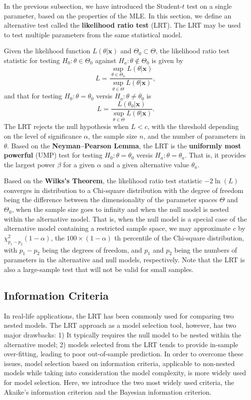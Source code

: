 \documentclass[]{book}
\theoremstyle{definition}
\theoremstyle{definition}
\theoremstyle{definition}
\theoremstyle{remark}
\begin{document}
In the previous subsection, we have introduced the Student-\(t\) test on
a single parameter, based on the properties of the MLE. In this section,
we define an alternative test called the \textbf{likelihood ratio test}
(LRT). The LRT may be used to test multiple parameters from the same
statistical model.

Given the likelihood function \(L(\theta|\mathbf{x})\) and
\(\Theta_0 \subset \Theta\), the likelihood ratio test statistic for
testing \(H_0:\theta\in\Theta_0\) against \(H_a:\theta\notin\Theta_0\)
is given by
\[L=\frac{\sup_{\theta\in\Theta_0}L(\theta|\mathbf{x})}{\sup_{\theta\in\Theta}L(\theta|\mathbf{x})},\]
and that for testing \(H_0:\theta=\theta_0\) versis
\(H_a:\theta\neq\theta_0\) is
\[L=\frac{L(\theta_0|\mathbf{x})}{\sup_{\theta\in\Theta}L(\theta|\mathbf{x})}.\]
The LRT rejects the null hypothesis when \(L < c\), with the threshold
depending on the level of significance \(\alpha\), the sample size
\(n\), and the number of parameters in \(\theta\). Based on the
\textbf{Neyman--Pearson Lemma}, the LRT is the \textbf{uniformly most
powerful} (UMP) test for testing \(H_0:\theta=\theta_0\) versis
\(H_a:\theta=\theta_a\). That is, it provides the largest power
\(\beta\) for a given \(\alpha\) and a given alternative value
\(\theta_a\).

Based on the \textbf{Wilks's Theorem}, the likelihood ratio test
statistic \(-2\ln(L)\) converges in distribution to a Chi-square
distribution with the degree of freedom being the difference between the
dimensionality of the parameter spaces \(\Theta\) and \(\Theta_0\), when
the sample size goes to infinity and when the null model is nested
within the alternative model. That is, when the null model is a special
case of the alternative model containing a restricted sample space, we
may approximate \(c\) by \(\chi^2_{p_1 - p_2}(1-\alpha)\), the
\(100\times(1-\alpha)\) th percentile of the Chi-square distribution,
with \(p_1-p_2\) being the degrees of freedom, and \(p_1\) and \(p_2\)
being the numbers of parameters in the alternative and null models,
respectively. Note that the LRT is also a large-sample test that will
not be valid for small samples.

\subsection{Information Criteria}\label{information-criteria}

In real-life applications, the LRT has been commonly used for comparing
two nested models. The LRT approach as a model selection tool, however,
has two major drawbacks: 1) It typically requires the null model to be
nested within the alternative model; 2) models selected from the LRT
tends to provide in-sample over-fitting, leading to poor out-of-sample
prediction. In order to overcome these issues, model selection based on
information criteria, applicable to non-nested models while taking into
consideration the model complexity, is more widely used for model
selection. Here, we introduce the two most widely used criteria, the
Akaike's information criterion and the Bayesian information criterion.
\end{document}
